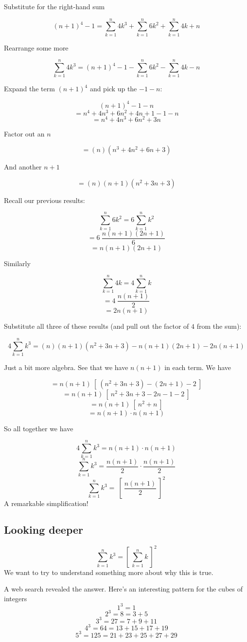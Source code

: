 \documentclass[11pt, oneside]{article}
\begin{document}
Substitute for the right-hand sum

\[ (n+1)^4 - 1 = \sum_{k=1}^n 4k^3 + \sum_{k=1}^n 6k^2 + \sum_{k=1}^n 4k + n \]

Rearrange some more

\[ \sum_{k=1}^n 4k^3 = (n+1)^4 - 1 - \sum_{k=1}^n 6k^2 - \sum_{k=1}^n 4k - n \]

Expand the term $(n+1)^4$ and pick up the $-1 - n$:

\[ (n+1)^4 - 1 - n \]
\[ = n^4 + 4n^3 + 6n^2 + 4n + 1 - 1 - n \]
\[ =  n^4 + 4n^3 + 6n^2 + 3n  \]

Factor out an $n$

\[ = (n)(n^3 + 4n^2 + 6n + 3) \]

And another $n+1$

\[ = (n)(n+1)(n^2 + 3n + 3) \]

Recall our previous results:

\[ \sum_{k=1}^n 6k^2 = 6 \sum_{k=1}^n k^2 \]
\[ = 6 \ \frac{n(n+1)(2n+1)}{6}  \] 
\[ = n(n+1)(2n+1) \] 

Similarly

\[ \sum_{k=1}^n 4k = 4 \sum_{k=1}^n k \]
\[ = 4 \ \frac{n(n+1)}{2} \]
\[ = 2 n(n+1) \]

Substitute all three of these results (and pull out the factor of $4$ from the sum):

\[ 4\sum_{k=1}^n k^3 = (n)(n+1)(n^2 + 3n + 3) - n(n+1)(2n+1) -  2 n(n+1) \] 

Just a bit more algebra.  See that we have $n(n+1)$ in each term.  We have

\[ = n(n+1) \ [ \ (n^2 + 3n + 3) - (2n+1) -  2 \ ]  \]
\[ = n(n+1) \ [ \ n^2 + 3n + 3 - 2n - 1 -  2 \ ]  \]
\[ = n(n+1) \ [ \ n^2 + n  \ ]  \]
\[ = n(n+1)  \cdot  n(n+1)  \]

So all together we have

\[ 4\sum_{k=1}^n k^3 = n(n+1) \cdot n (n+1) \] 
\[ \sum_{k=1}^n k^3 = \frac{n(n+1)}{2} \cdot \frac{n (n+1)}{2} \] 
\[ \sum_{k=1}^n k^3 = \ [ \ \frac{n(n+1)}{2} \ ]^2 \] 
A remarkable simplification! 

\subsection*{Looking deeper}

\[ \sum\limits_{k=1}^n k^3 = [\ \sum\limits_{k=1}^n k \ ] ^2 \]
We want to try to understand something more about why this is true.  

A web search revealed the answer.  Here's an interesting pattern for the cubes of integers
\[ 1^3 = 1 \]
\[ 2^3 = 8 = 3 + 5 \]
\[ 3^3 = 27 = 7 + 9 + 11 \]
\[ 4^3 = 64 = 13 + 15 + 17 + 19 \]
\[ 5^3 = 125 = 21 + 23 + 25 + 27 + 29  \]
\end{document}
